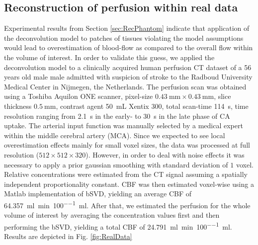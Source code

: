 \documentclass[journal,twocolumn]{IEEEtran}
\newcommand{\siPml}{\milli\litre\per\minute\per100\milli\litre}
\begin{document}
	
	\subsection{Reconstruction of perfusion within real data}\label{sec:RealData}
 	Experimental results from Section \ref{sec:RecPhantom} indicate that application of the deconvolution model to patches of tissues violating the model assumptions would lead to overestimation of blood-flow as compared to the overall flow within the volume of interest.
	In order to validate this guess, we applied the deconvolution model to a clinically acquired human perfusion CT dataset of a 56 years old male male admitted with suspicion of stroke to the Radboud University Medical Center in Nijmegen, the Netherlands.
	The perfusion scan was obtained using a Toshiba Aquilon ONE scanner, pixel-size $\SI{0.43}{\milli\meter}\times\SI{0.43}{\milli\meter}$, slice thickness $\SI{0.5}{\milli\meter}$, contrast agent \SI{50}{\milli\liter} Xentix 300, total scan-time \SI{114}{\second}, time resolution ranging from \SI{2.1}{\second} in the early- to \SI{30}{\second} in the late phase of CA uptake.
	The arterial input function was manually selected by a medical expert within the middle cerebral artery (MCA).
	Since we expected to see local overestimation effects mainly for small voxel sizes, the data was processed at full resolution ($512\times512\times320$). 
	However, in order to deal with noise effects it was necessary to apply a prior gaussian smoothing with standard deviation of $1$ voxel.	
	Relative concentrations were estimated from the CT signal assuming a spatially independent proportionality constant.
	CBF was then estimated voxel-wise using a Matlab implementation of bSVD, yielding an average CBF of \SI{64.357}{\siPml}.
	After that, we estimated the perfusion for the whole volume of interest by averaging the concentration values first and then performing the bSVD, yielding a total CBF of \SI{24.791}{\siPml}.
	Results are depicted in Fig. \ref{fig:RealData}
	
\end{document}
